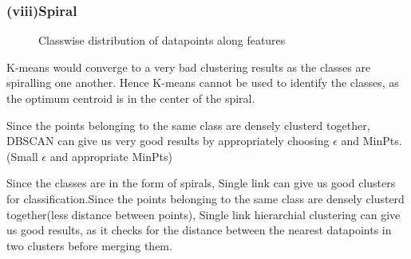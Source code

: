 \documentclass[paper=a4, fontsize=11pt]{scrartcl}
\numberwithin{equation}{section}		%
\numberwithin{figure}{section}			%
\numberwithin{table}{section}				%
\begin{document}
\subsubsection*{(viii)Spiral}
\begin{figure}[H]
  \centering
  \hfill
  \caption*{Classwise distribution of datapoints along features}
\end{figure}

K-means would converge to a very bad clustering results as the classes are spiralling one another. Hence K-means cannot be used to identify the classes, as the optimum centroid is in the center of the spiral.

Since the points belonging to the same class are densely clusterd together, DBSCAN can give us very good results by appropriately choosing $\epsilon$ and MinPts. (Small $\epsilon$ and appropriate MinPts)

Since the classes are in the form of spirals, Single link can give us good clusters for classification.Since the points belonging to the same class are densely clusterd together(less distance between points), Single link hierarchial clustering can give us good results, as it checks for the distance between the nearest datapoints in two clusters before merging them.
\end{document}
